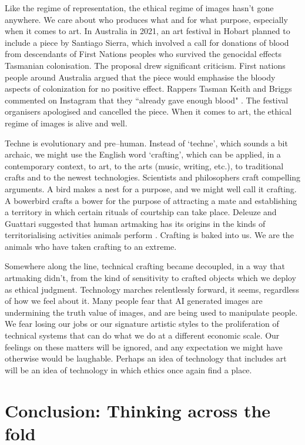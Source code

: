 \documentclass[letter:wpaper]{article}
\begin{document}
    Like the regime of representation, the ethical regime of images hasn't gone anywhere. We care about who produces what and for what purpose, especially when it comes to art. In Australia in 2021, an art festival in Hobart planned to include a piece by Santiago Sierra, which involved a call for donations of blood from descendants of First Nations peoples who survived the genocidal effects Tasmanian colonisation. The proposal drew significant criticism. First nations people around Australia argued that the piece would emphasise the bloody aspects of colonization for no positive effect. Rappers Tasman Keith and Briggs commented on Instagram that they “already gave enough blood" \citep{DrkMfBld2021}. The festival organisers apologised and cancelled the piece. When it comes to art, the ethical regime of images is alive and well.

    Techne is evolutionary and pre–human. Instead of ‘techne’, which sounds a bit archaic, we might use the English word ‘crafting’, which can be applied, in a contemporary context, to art, to the arts (music, writing, etc.), to traditional crafts and to the newest technologies. Scientists and philosophers craft compelling arguments. A bird makes a nest for a purpose, and we might well call it crafting. A bowerbird crafts a bower for the purpose of attracting a mate and establishing a territory in which certain rituals of courtship can take place. Deleuze and Guattari suggested that human artmaking has its origins in the kinds of territorialising activities animals perform \citep[p.15]{GuattariChsmss1995}. Crafting is baked into us. We are the animals who have taken crafting to an extreme.

    Somewhere along the line, technical crafting became decoupled, in a way that artmaking didn't, from the kind of sensitivity to crafted objects which we deploy as ethical judgment. Technology marches relentlessly forward, it seems, regardless of how we feel about it. Many people fear that AI generated images are undermining the truth value of images, and are being used to manipulate people. We fear losing our jobs or our signature artistic styles to the proliferation of technical systems that can do what we do at a different economic scale. Our feelings on these matters will be ignored, and any expectation we might have otherwise would be laughable. Perhaps an idea of technology that includes art will be an idea of technology in which ethics once again find a place.
    
\section{Conclusion: Thinking across the fold}
\end{document}
